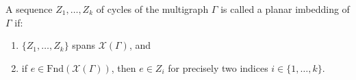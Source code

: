 A sequence $Z_1, \ldots, Z_k$ of cycles of the multigraph $\Gamma$ is called a planar imbedding of $\Gamma$ if:
\begin{enumerate}
\item $\{Z_1, \ldots, Z_k\}$ spans $\mathcal{X}(\Gamma)$, and
\item if $e \in \mathrm{Fnd}(\mathcal{X}(\Gamma))$, then $e \in Z_i$ for precisely two indices $i \in \{1, \ldots, k\}$.
\end{enumerate}
